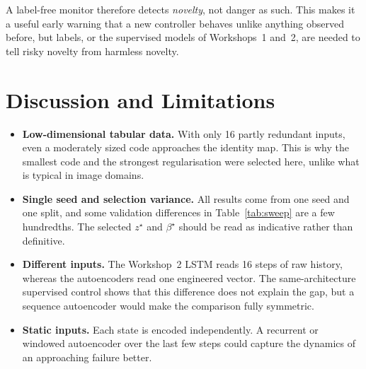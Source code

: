 \documentclass[conference]{IEEEtran}
\begin{document}
A label-free monitor therefore detects \emph{novelty}, not danger as such. This makes it a
useful early warning that a new controller behaves unlike anything observed before, but
labels, or the supervised models of Workshops~1 and~2, are needed to tell risky novelty
from harmless novelty.

\section{Discussion and Limitations}
\begin{itemize}
\item \textbf{Low-dimensional tabular data.} With only 16 partly redundant inputs, even a
moderately sized code approaches the identity map. This is why the smallest code and the
strongest regularisation were selected here, unlike what is typical in image domains.
\item \textbf{Single seed and selection variance.} All results come from one seed and one
split, and some validation differences in Table~\ref{tab:sweep} are a few hundredths. The
selected $z^\star$ and $\beta^\star$ should be read as indicative rather than definitive.
\item \textbf{Different inputs.} The Workshop~2 LSTM reads 16 steps of raw history,
whereas the autoencoders read one engineered vector. The same-architecture supervised control
shows that this difference does not explain the gap, but a sequence autoencoder would make the
comparison fully symmetric.
\item \textbf{Static inputs.} Each state is encoded independently. A recurrent or windowed
autoencoder over the last few steps could capture the dynamics of an approaching failure
better.
\end{itemize}

\end{document}
